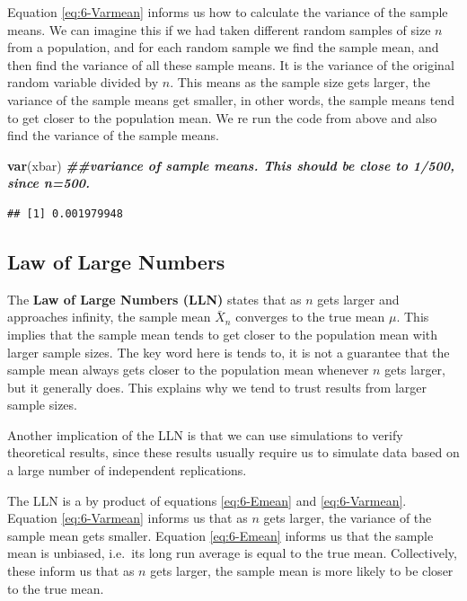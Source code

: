 \documentclass[
]{book}
\newenvironment{Shaded}{\begin{snugshade}}{\end{snugshade}}
\newcommand{\DocumentationTok}[1]{\textcolor[rgb]{0.56,0.35,0.01}{\textbf{\textit{#1}}}}
\newcommand{\FunctionTok}[1]{\textcolor[rgb]{0.13,0.29,0.53}{\textbf{#1}}}
\newcommand{\NormalTok}[1]{#1}
\begin{document}
Equation \eqref{eq:6-Varmean} informs us how to calculate the variance of the sample means. We can imagine this if we had taken different random samples of size \(n\) from a population, and for each random sample we find the sample mean, and then find the variance of all these sample means. It is the variance of the original random variable divided by \(n\). This means as the sample size gets larger, the variance of the sample means get smaller, in other words, the sample means tend to get closer to the population mean. We re run the code from above and also find the variance of the sample means.

\begin{Shaded}
\begin{Highlighting}[]
\FunctionTok{var}\NormalTok{(xbar) }\DocumentationTok{\#\#variance of sample means. This should be close to 1/500, since n=500. }
\end{Highlighting}
\end{Shaded}

\begin{verbatim}
## [1] 0.001979948
\end{verbatim}

\hypertarget{law-of-large-numbers}{%
\subsection{Law of Large Numbers}\label{law-of-large-numbers}}

The \textbf{Law of Large Numbers (LLN)} states that as \(n\) gets larger and approaches infinity, the sample mean \(\bar{X}_n\) converges to the true mean \(\mu\). This implies that the sample mean tends to get closer to the population mean with larger sample sizes. The key word here is tends to, it is not a guarantee that the sample mean always gets closer to the population mean whenever \(n\) gets larger, but it generally does. This explains why we tend to trust results from larger sample sizes.

Another implication of the LLN is that we can use simulations to verify theoretical results, since these results usually require us to simulate data based on a large number of independent replications.

The LLN is a by product of equations \eqref{eq:6-Emean} and \eqref{eq:6-Varmean}. Equation \eqref{eq:6-Varmean} informs us that as \(n\) gets larger, the variance of the sample mean gets smaller. Equation \eqref{eq:6-Emean} informs us that the sample mean is unbiased, i.e.~its long run average is equal to the true mean. Collectively, these inform us that as \(n\) gets larger, the sample mean is more likely to be closer to the true mean.
\end{document}
